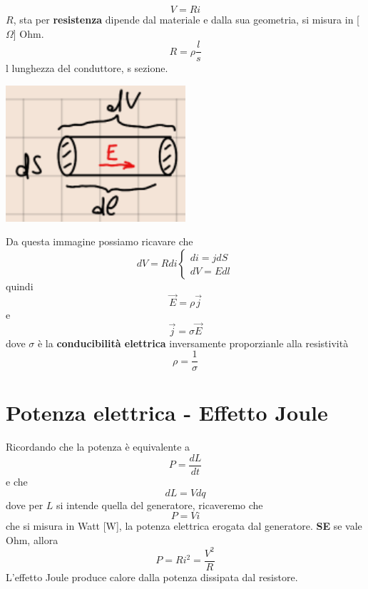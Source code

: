 \documentclass[a4paper, 12pt]{book}
\theoremstyle{plain}
\begin{document}
\[
    V = Ri
\]
$R$, sta per \textbf{resistenza} dipende dal materiale
 e dalla sua geometria, si misura in [$\Omega$] Ohm.
\[
    R = \rho \frac{l}{s}
\]
l lunghezza del conduttore, s sezione.
\begin{center}
    \includegraphics[width=0.5\textwidth]{ohm.png}
\end{center}
Da questa immagine possiamo ricavare che 
\[
    dV = Rdi \begin{cases}
        di = jdS \\
        dV = Edl
    \end{cases}
\]
quindi 
\[
    \vec{E} = \rho \vec{j}
\]
e 
\[
    \vec{j} = \sigma \vec{E}
\]
dove $\sigma$ è la \textbf{conducibilità elettrica}
inversamente proporzianle alla resistività
\[
    \rho = \frac{1}{\sigma}
\]

\section{Potenza elettrica - Effetto Joule}

Ricordando che la potenza è equivalente a 
\[
    P = \frac{dL}{dt}
\]
e che 
\[
    dL = Vdq
\]
dove per $L$ si intende quella del generatore, ricaveremo 
che 
\[
    P = Vi
\]
che si misura in Watt [W], la potenza elettrica erogata
dal generatore. \textbf{SE} se vale Ohm, allora 
\[
    P = Ri^2 = \frac{V^2}{R}
\]
L'effetto Joule produce calore dalla potenza dissipata 
dal resistore.
\end{document}
